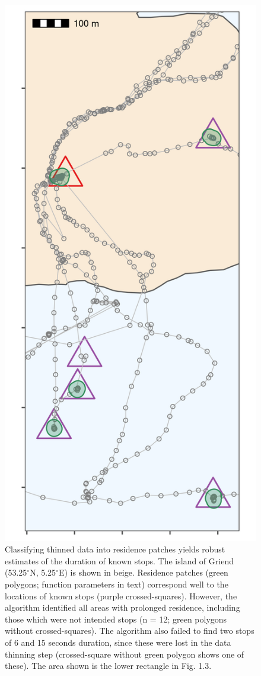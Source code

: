 \documentclass[]{scrreprt}
\begin{document}
\begin{figure}
\centering
\includegraphics{figures/fig_calib_residence.png}
\caption{Classifying thinned data into residence patches yields robust estimates of the duration of known stops. The island of Griend (53.25\(^{\circ}\)N, 5.25\(^{\circ}\)E) is shown in beige. Residence patches (green polygons; function parameters in text) correspond well to the locations of known stops (purple crossed-squares). However, the algorithm identified all areas with prolonged residence, including those which were not intended stops (n = 12; green polygons without crossed-squares). The algorithm also failed to find two stops of 6 and 15 seconds duration, since these were lost in the data thinning step (crossed-square without green polygon shows one of these). The area shown is the lower rectangle in Fig. 1.3.}
\end{figure}
\end{document}
